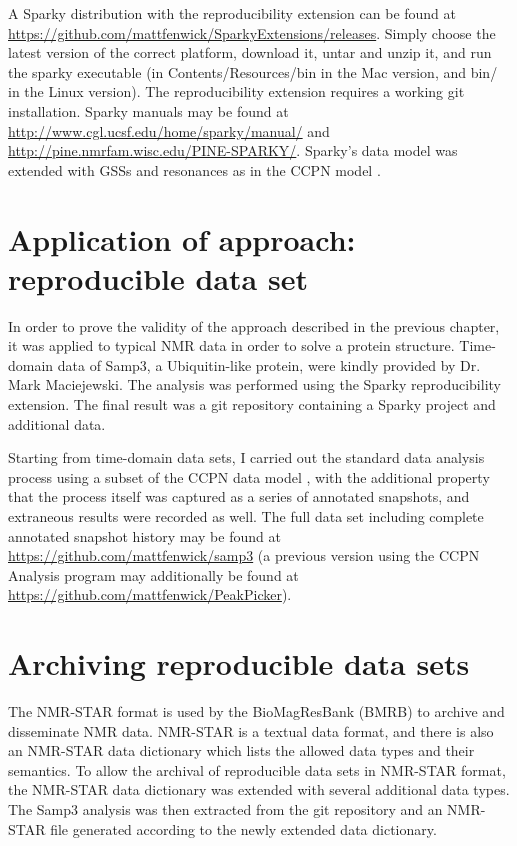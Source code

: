 A Sparky distribution with the reproducibility extension can be found at
\url{https://github.com/mattfenwick/SparkyExtensions/releases}.  Simply 
choose the latest version of the correct platform, download it, untar and 
unzip it, and run the sparky executable (in Contents/Resources/bin in the
Mac version, and bin/ in the Linux version).
The reproducibility extension requires a working git installation.
Sparky manuals may be found at \url{http://www.cgl.ucsf.edu/home/sparky/manual/} 
and \url{http://pine.nmrfam.wisc.edu/PINE-SPARKY/}.
Sparky's data model was extended with GSSs and resonances as in the CCPN model \cite{ccpn}.



\section{Application of approach: reproducible data set}
In order to prove the validity of the approach described in the previous chapter, 
it was applied to typical NMR data in order to solve a protein structure.
Time-domain data of Samp3, a Ubiquitin-like protein, were kindly provided by 
Dr. Mark Maciejewski.  The analysis was performed using the Sparky reproducibility
extension.  The final result was a git repository containing a Sparky project
and additional data.

Starting from time-domain data sets, I carried out the 
standard data analysis process using a subset of the CCPN data model \cite{ccpn}, 
with the additional property that the process itself was captured as
a series of annotated snapshots, and extraneous results were recorded as well.
The full data set including complete annotated snapshot history may be found at 
\url{https://github.com/mattfenwick/samp3}
(a previous version using the CCPN Analysis program may additionally be found
at \url{https://github.com/mattfenwick/PeakPicker}).



\section{Archiving reproducible data sets}
The NMR-STAR format is used by the BioMagResBank (BMRB) to archive and
disseminate NMR data.  NMR-STAR is a textual data format, and there is also
an NMR-STAR data dictionary which lists the allowed data types and their
semantics.  To allow the archival of reproducible data sets in NMR-STAR format,
the NMR-STAR data dictionary was extended with several additional data types.
The Samp3 analysis was then extracted from the git repository and an NMR-STAR
file generated according to the newly extended data dictionary.





